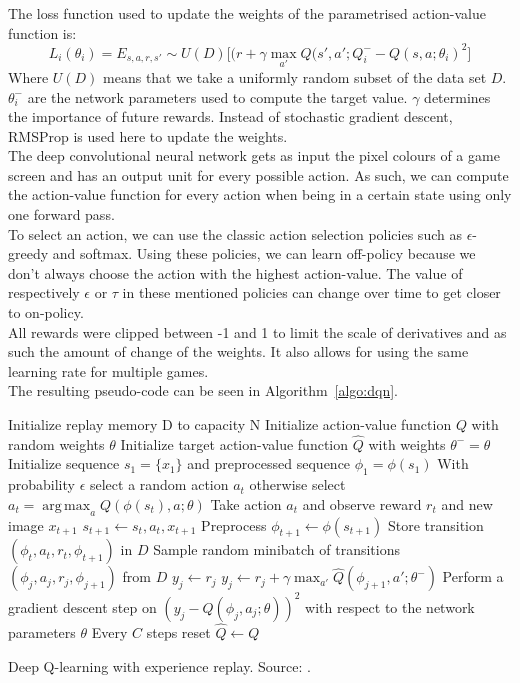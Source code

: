 \documentclass[a4paper, 11pt]{article}
\DeclareMathOperator*{\argmax}{arg\,max}
\begin{document}
The loss function used to update the weights of the parametrised action-value function is:
\begin{equation}
L_i(\theta_i) = E_{s,a,r,s'} \sim U(D) \big [ (r + \gamma \max_{a'} Q(s',a'; Q^{-}_i - Q(s,a;\theta_i)^2 \big ]
\end{equation}
Where $U(D)$ means that we take a uniformly random subset of the data set $D$. $\theta^{-}_i$ are the network parameters used to compute the target value. $\gamma$ determines the importance of future rewards. Instead of stochastic gradient descent, RMSProp is used here to update the weights.\\

The deep convolutional neural network gets as input the pixel colours of a game screen and has an output unit for every possible action. As such, we can compute the action-value function for every action when being in a certain state using only one forward pass.\\

To select an action, we can use the classic action selection policies such as $\epsilon$-greedy and softmax. Using these policies, we can learn off-policy because we don't always choose the action with the highest action-value. The value of respectively $\epsilon$ or $\tau$ in these mentioned policies can change over time to get closer to on-policy.\\

All rewards were clipped between -1 and 1 to limit the scale of derivatives and as such the amount of change of the weights. It also allows for using the same learning rate for multiple games.\\
The resulting pseudo-code can be seen in Algorithm~\ref{algo:dqn}.\\
\begin{algorithm}[htb]
\DontPrintSemicolon
Initialize replay memory D to capacity N\;
Initialize action-value function $Q$ with random weights $\theta$\;
Initialize target action-value function $\hat{Q}$ with weights $\theta^- = \theta$\;
 {
	Initialize sequence $s_1 = \{x_1\}$ and preprocessed sequence $\phi_1 = \phi(s_1)$\;
     {
    	With probability $\epsilon$ select a random action $a_t$\;
        otherwise select $a_t = \argmax_a Q(\phi(s_t),a;\theta)$\;
        Take action $a_t$ and observe reward $r_t$ and new image $x_{t+1}$\;
        $s_{t+1} \gets s_t,a_t,x_{t+1}$\;
        Preprocess $\phi_{t+1} \gets \phi(s_{t+1})$\;
        Store transition $(\phi_t,a_t,r_t,\phi_{t+1})$ in $D$\;
        Sample random minibatch of transitions $(\phi_j,a_j,r_j,\phi_{j+1})$ from $D$\;
         {
        	$y_j \gets r_j$\;
        }{
        	$y_j \gets r_j + \gamma \max_{a'} \hat{Q}(\phi_{j+1},a';\theta^-)$\;
        }
        Perform a gradient descent step on $(y_j - Q(\phi_j,a_j;\theta))^2$ with respect to the network parameters $\theta$\;
        Every $C$ steps reset $\hat{Q} \gets Q$\;
    }
}
\caption[Deep Q-learning with experience replay]{Deep Q-learning with experience replay. Source: \cite{mnih2013playing}.}
\label{algo:dqn}
\end{algorithm}
\end{document}
